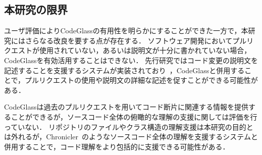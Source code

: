 \subsection{本研究の限界}

ユーザ評価によりCodeGlassの有用性を明らかにすることができた一方で，本研究にはさらなる改良を要する点が存在する．
ソフトウェア開発においてプルリクエストが使用されていない，あるいは説明文が十分に書かれていない場合，CodeGlassを有効活用することはできない．
先行研究ではコード変更の説明文を記述することを支援するシステムが実装されており~\cite{ChangeScribe}，CodeGlassと併用することで，プルリクエストの使用や説明文の詳細な記述を促すことができる可能性がある．


CodeGlassは過去のプルリクエストを用いてコード断片に関連する情報を提供することができるが，ソースコード全体の俯瞰的な理解の支援に関しては評価を行っていない．
リポジトリのファイルやクラス構造の理解支援は本研究の目的とは外れるが，Chronicler~\cite{Chronicler}のようなソースコード全体の理解を支援するシステムと併用することで，コード理解をより包括的に支援できる可能性がある．






